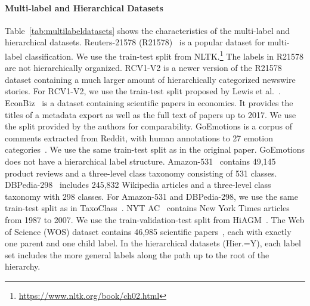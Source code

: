 \documentclass[lettersize,journal]{IEEEtran}
\begin{document}
\paragraph{Multi-label and Hierarchical Datasets}
\label{sec:multi-label-datasets}
Table~\ref{tab:multilabeldatasets} shows the characteristics of the multi-label and hierarchical datasets.
Reuters-21578 (R21578)~\cite{reuters} is a popular dataset for multi-label classification.
We use the train-test split from NLTK.\footnote{\url{https://www.nltk.org/book/ch02.html}}
The labels in R21578 are not hierarchically organized.
RCV1-V2 is a newer version of the R21578 dataset containing a much larger amount of hierarchically categorized newswire stories. 
For RCV1-V2, we use the train-test split proposed by Lewis et al.~\cite{rcv1-v2}. 
EconBiz~\cite{DBLP:conf/jcdl/MaiGS18} is a dataset containing scientific papers in economics.
It provides the titles of a metadata export as well as the full text of papers up to 2017.
We use the split provided by the authors for comparability.
GoEmotions is a corpus of comments extracted from Reddit, with human annotations to 27 emotion categories~\cite{demszky2020goemotions}. 
We use the same train-test split as in the original paper. 
GoEmotions does not have a hierarchical label structure. Amazon-531~\cite{hiddenfactors} contains
49,145 product reviews and a three-level class taxonomy consisting of 531 classes. 
DBPedia-298~\cite{Lehmann2015DBpediaA} includes 245,832 Wikipedia articles and a three-level class taxonomy with 298 classes. For Amazon-531 and DBPedia-298, we use the same train-test split as in TaxoClass~\cite{shen-etal-2021-taxoclass}.
NYT AC~\cite{sandhaus} contains New York Times articles from 1987 to 2007. We use the train-validation-test split from HiAGM~\cite{hiagm}.
The Web of Science (WOS) dataset contains 46,985 scientific papers~\cite{DBLP:conf/icmla/KowsariBHMGB17}, each with exactly one parent and one child label.
In the hierarchical datasets (Hier.=Y), each label set includes the more general labels along the path up to the root of the hierarchy.
\end{document}
